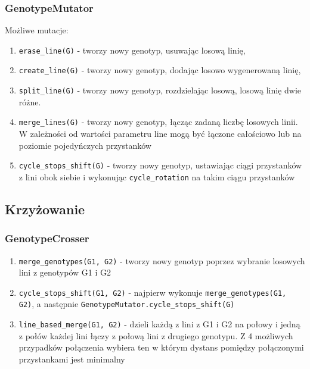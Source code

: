 \documentclass[12pt,a4paper]{article}
\begin{document}
\subsubsection{GenotypeMutator}

Możliwe mutacje:

\begin{enumerate}
    \item \lstinline{erase_line(G)} - tworzy nowy genotyp, usuwając losową linię,
    \item \lstinline{create_line(G)} - tworzy nowy genotyp, dodając losowo wygenerowaną linię,
    \item \lstinline{split_line(G)} - tworzy nowy genotyp, rozdzielając losową, losową linię dwie różne.
    \item \lstinline{merge_lines(G)} - tworzy nowy genotyp, łącząc zadaną liczbę losowych linii. W zależności od wartości parametru line mogą być łączone całościowo lub na poziomie pojedyńczych przystanków
    \item \lstinline{cycle_stops_shift(G)} - tworzy nowy genotyp, ustawiając ciągi przystanków z lini obok siebie i wykonując \lstinline{cycle_rotation} na takim ciągu przystanków
\end{enumerate}

\subsection{Krzyżowanie}

\subsubsection{GenotypeCrosser}

\begin{enumerate}
    \item \lstinline{merge_genotypes(G1, G2)} - tworzy nowy genotyp poprzez wybranie losowych lini z genotypów G1 i G2
    \item \lstinline{cycle_stops_shift(G1, G2)} - najpierw wykonuje \lstinline{merge_genotypes(G1, G2)}, a następnie \lstinline{GenotypeMutator.cycle_stops_shift(G)}
    \item \lstinline{line_based_merge(G1, G2)} - dzieli każdą z lini z G1 i G2 na połowy i jedną z połów każdej lini łączy z połową lini z drugiego genotypu. Z 4 możliwych przypadków połączenia wybiera ten w którym dystans pomiędzy połączonymi przystankami jest minimalny
\end{enumerate}
\end{document}
